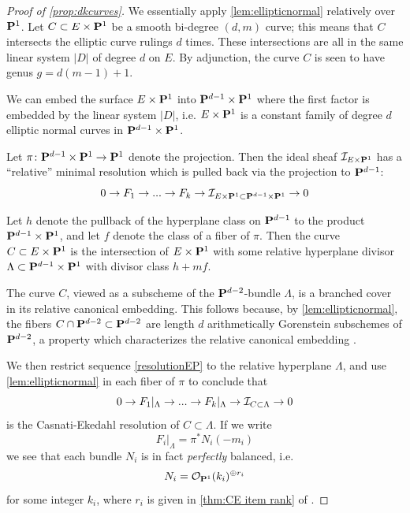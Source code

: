 \documentclass[11pt, two side, letterpaper, final]{amsart}
\renewcommand{\P}{{\bf P}}
\newcommand {\from}{\colon}
\newcommand{\cO}{\mathcal{O}}
\begin{document}
\begin{proof}[Proof of \cref{prop:dkcurves}]
We essentially apply \cref{lem:ellipticnormal} relatively over $\P^{1}$.  Let $C \subset E \times \P^1$ be a smooth bi-degree $(d,m)$ curve; this means that $C$ intersects the elliptic curve rulings $d$ times.  These intersections are all in the same linear system $|D|$ of degree $d$ on $E$.   By adjunction, the curve $C$ is seen to have genus $g = d(m-1) + 1$.

We can embed the surface $E \times \P^1$ into $\P^{d-1} \times \P^1$ where the first factor is embedded by the linear system $|D|$, i.e. $E \times \P^1$ is a constant family of degree $d$ elliptic normal curves in $\P^{d-1} \times \P^1$. 

Let $\pi \from \P^{d-1} \times \P^1 \to \P^1$ denote the projection.  Then the ideal sheaf $\sh I_{E \times \P^1}$ has a ``relative'' minimal resolution which is pulled back via the projection to $\P^{d-1}$:
\begin{equation}\label{resolutionEP}
0 \to F_{1} \to ... \to F_{k}\to {\sh I}_{E \times \P^{1} \subset \P^{d-1} \times \P^{1}} \to 0
\end{equation}

Let $h$ denote the pullback of the hyperplane class on $\P^{d-1}$ to the product $\P^{d-1} \times \P^{1}$, and let $f$ denote the class of a fiber of $\pi$. Then the curve $C \subset E \times \P^{1}$ is the intersection of $E \times \P^{1}$ with some relative hyperplane divisor $\Lambda \subset \P^{d-1} \times \P^{1}$ with divisor class $h+mf$.  

The curve $C$, viewed as a subscheme of the $\P^{d-2}$-bundle $\Lambda$, is a branched cover in its relative canonical embedding. This follows because, by \cref{lem:ellipticnormal}, the fibers $C \cap \P^{d-2} \subset \P^{d-2}$ are length $d$ arithmetically Gorenstein subschemes of $\P^{d-2}$, a property which characterizes the relative canonical embedding \cite{casnati_covers_1996}.

We then restrict sequence \eqref{resolutionEP} to the relative hyperplane $\Lambda$, and use \cref{lem:ellipticnormal} in each fiber of $\pi$ to conclude that 
\begin{equation}\label{resolutionELambda}
0 \to F_{1}|_{\Lambda} \to ... \to F_{k}|_{\Lambda}\to {{\mathcal I}}_{C  \subset \Lambda} \to 0
\end{equation}
is the Casnati-Ekedahl resolution of $C \subset \Lambda$. If we write \[F_{i}|_{\Lambda} = \pi^{*}N_{i}(-m_{i})\] we see that each bundle $N_{i}$ is in fact \emph{perfectly} balanced, i.e. \[N_{i} = \cO_{\P^{1}}(k_{i})^{\oplus r_{i}}\] for some integer $k_{i}$, where $r_{i}$ is given in \cref{thm:CE item rank} of .  

\end{proof}
\end{document}
